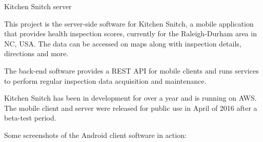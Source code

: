 \documentclass[DIV16,twocolumn,10pt]{scrreprt}
\begin{document}
\begin{hcarentry}{Kitchen Snitch server}
\makeheader

This project is the server-side software for Kitchen Snitch, a mobile application that provides health inspection scores, currently for the Raleigh-Durham area in NC, USA. The data can be accessed on maps along with inspection details, directions and more.

The back-end software provides a REST API for mobile clients and runs services to perform regular inspection data acquisition and maintenance.

Kitchen Snitch has been in development for over a year and is running on AWS. The mobile client and server were released for public use in April of 2016 after a beta-test period.

Some screenshots of the Android client software in action:


\end{hcarentry}
\end{document}
